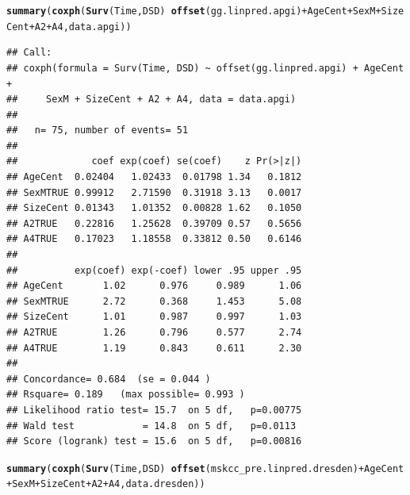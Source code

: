 \documentclass{article}\usepackage[]{graphicx}\usepackage[]{color}
\makeatletter
\newcommand{\hlopt}[1]{\textcolor[rgb]{0,0,0}{#1}}%
\newcommand{\hlstd}[1]{\textcolor[rgb]{0.345,0.345,0.345}{#1}}%
\newcommand{\hlkwd}[1]{\textcolor[rgb]{0.737,0.353,0.396}{\textbf{#1}}}%
\newenvironment{kframe}{%
 \def\at@end@of@kframe{}%
 \ifinner\ifhmode%
  \def\at@end@of@kframe{\end{minipage}}%
  \begin{minipage}{\columnwidth}%
 \fi\fi%
 \def\FrameCommand##1{\hskip\@totalleftmargin \hskip-\fboxsep
 \colorbox{shadecolor}{##1}\hskip-\fboxsep
     \hskip-\linewidth \hskip-\@totalleftmargin \hskip\columnwidth}%
 \MakeFramed {\advance\hsize-\width
   \@totalleftmargin\z@ \linewidth\hsize
   \@setminipage}}%
 {\par\unskip\endMakeFramed%
 \at@end@of@kframe}
\newenvironment{knitrout}{}{} %
\makeatother
\begin{document}
\begin{knitrout}
\begin{kframe}
{\ttfamily\noindent\bfseries\color{errorcolor}{\#\# Error in fitter(X, Y, strats, offset, init, control, weights = weights, : NA/NaN/Inf in foreign function call (arg 6)}}\begin{alltt}
\hlkwd{summary}\hlstd{(}\hlkwd{coxph}\hlstd{(}\hlkwd{Surv}\hlstd{(Time, DSD)} \hlopt{~} \hlkwd{offset}\hlstd{(gg.linpred.apgi)} \hlopt{+} \hlstd{AgeCent} \hlopt{+} \hlstd{SexM} \hlopt{+} \hlstd{SizeCent} \hlopt{+} \hlstd{A2} \hlopt{+} \hlstd{A4, data.apgi))}
\end{alltt}
\begin{verbatim}
## Call:
## coxph(formula = Surv(Time, DSD) ~ offset(gg.linpred.apgi) + AgeCent + 
##     SexM + SizeCent + A2 + A4, data = data.apgi)
## 
##   n= 75, number of events= 51 
## 
##             coef exp(coef) se(coef)    z Pr(>|z|)
## AgeCent  0.02404   1.02433  0.01798 1.34   0.1812
## SexMTRUE 0.99912   2.71590  0.31918 3.13   0.0017
## SizeCent 0.01343   1.01352  0.00828 1.62   0.1050
## A2TRUE   0.22816   1.25628  0.39709 0.57   0.5656
## A4TRUE   0.17023   1.18558  0.33812 0.50   0.6146
## 
##          exp(coef) exp(-coef) lower .95 upper .95
## AgeCent       1.02      0.976     0.989      1.06
## SexMTRUE      2.72      0.368     1.453      5.08
## SizeCent      1.01      0.987     0.997      1.03
## A2TRUE        1.26      0.796     0.577      2.74
## A4TRUE        1.19      0.843     0.611      2.30
## 
## Concordance= 0.684  (se = 0.044 )
## Rsquare= 0.189   (max possible= 0.993 )
## Likelihood ratio test= 15.7  on 5 df,   p=0.00775
## Wald test            = 14.8  on 5 df,   p=0.0113
## Score (logrank) test = 15.6  on 5 df,   p=0.00816
\end{verbatim}
\begin{alltt}
\hlkwd{summary}\hlstd{(}\hlkwd{coxph}\hlstd{(}\hlkwd{Surv}\hlstd{(Time, DSD)} \hlopt{~} \hlkwd{offset}\hlstd{(mskcc_pre.linpred.dresden)} \hlopt{+} \hlstd{AgeCent} \hlopt{+} \hlstd{SexM} \hlopt{+} \hlstd{SizeCent} \hlopt{+} \hlstd{A2} \hlopt{+} \hlstd{A4, data.dresden))}
\end{alltt}



\end{kframe}
\end{knitrout}
\end{document}
